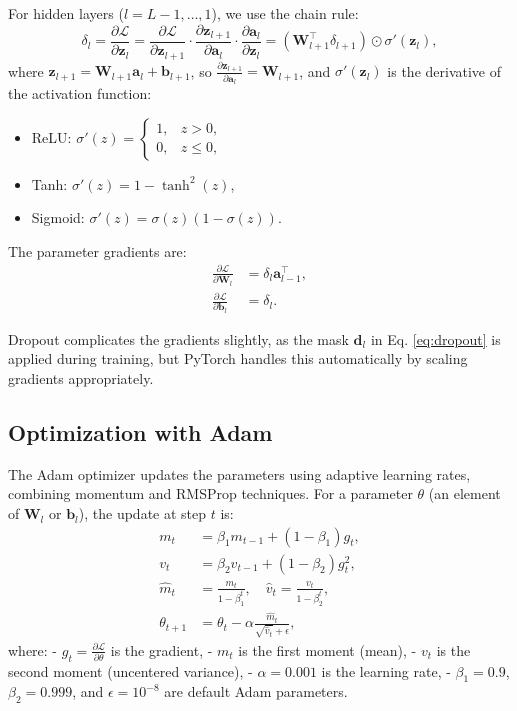 \documentclass[11pt, a4paper]{article}
\begin{document}
For hidden layers ($l = L-1, \dots, 1$), we use the chain rule:
\begin{equation}
    \delta_l = \frac{\partial \mathcal{L}}{\partial \mathbf{z}_l} = \frac{\partial \mathcal{L}}{\partial \mathbf{z}_{l+1}} \cdot \frac{\partial \mathbf{z}_{l+1}}{\partial \mathbf{a}_l} \cdot \frac{\partial \mathbf{a}_l}{\partial \mathbf{z}_l} = (\mathbf{W}_{l+1}^\top \delta_{l+1}) \odot \sigma'(\mathbf{z}_l), \label{eq:delta_hidden}
\end{equation}
where $\mathbf{z}_{l+1} = \mathbf{W}_{l+1} \mathbf{a}_l + \mathbf{b}_{l+1}$, so $\frac{\partial \mathbf{z}_{l+1}}{\partial \mathbf{a}_l} = \mathbf{W}_{l+1}$, and $\sigma'(\mathbf{z}_l)$ is the derivative of the activation function:
\begin{itemize}
    \item ReLU: $\sigma'(z) = \begin{cases} 1, & z > 0, \\ 0, & z \leq 0, \end{cases}$
    \item Tanh: $\sigma'(z) = 1 - \tanh^2(z)$,
    \item Sigmoid: $\sigma'(z) = \sigma(z)(1 - \sigma(z))$.
\end{itemize}

The parameter gradients are:
\begin{align}
    \frac{\partial \mathcal{L}}{\partial \mathbf{W}_l} &= \delta_l \mathbf{a}_{l-1}^\top, \label{eq:grad_w} \\
    \frac{\partial \mathcal{L}}{\partial \mathbf{b}_l} &= \delta_l. \label{eq:grad_b}
\end{align}

Dropout complicates the gradients slightly, as the mask $\mathbf{d}_l$ in Eq. \ref{eq:dropout} is applied during training, but PyTorch handles this automatically by scaling gradients appropriately.

\subsection{Optimization with Adam}
The Adam optimizer updates the parameters using adaptive learning rates, combining momentum and RMSProp techniques. For a parameter $\theta$ (an element of $\mathbf{W}_l$ or $\mathbf{b}_l$), the update at step $t$ is:
\begin{align}
    m_t &= \beta_1 m_{t-1} + (1 - \beta_1) g_t, \label{eq:adam_m} \\
    v_t &= \beta_2 v_{t-1} + (1 - \beta_2) g_t^2, \label{eq:adam_v} \\
    \hat{m}_t &= \frac{m_t}{1 - \beta_1^t}, \quad \hat{v}_t = \frac{v_t}{1 - \beta_2^t}, \label{eq:adam_bias} \\
    \theta_{t+1} &= \theta_t - \alpha \frac{\hat{m}_t}{\sqrt{\hat{v}_t} + \epsilon}, \label{eq:adam_update}
\end{align}
where:
- $g_t = \frac{\partial \mathcal{L}}{\partial \theta}$ is the gradient,
- $m_t$ is the first moment (mean),
- $v_t$ is the second moment (uncentered variance),
- $\alpha = 0.001$ is the learning rate,
- $\beta_1 = 0.9$, $\beta_2 = 0.999$, and $\epsilon = 10^{-8}$ are default Adam parameters.
\end{document}
